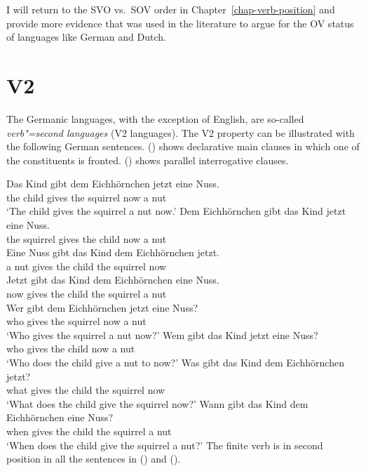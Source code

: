 I will return to the SVO vs.\ SOV order in Chapter~\ref{chap-verb-position} and provide more
evidence that was used in the literature to argue for the OV status of languages like German and Dutch.

\section{V2}
\label{sec-phenomenon-v2}

The Germanic languages, with the exception of English, are so-called \emph{verb"=second languages} (V2
languages). The V2
property can be illustrated with the following German sentences. () shows declarative main
clauses in which one of the constituents is fronted. () shows parallel interrogative clauses.

\eal
\ex 
\gll Das Kind  gibt dem Eichhörnchen jetzt eine Nuss.\\
     the child gives the squirrel now a nut\\
\glt `The child gives the squirrel a nut now.'
\ex 
\gll Dem Eichhörnchen gibt das Kind jetzt eine Nuss.\\
     the squirrel gives the child now a nut\\
\ex 
\gll Eine Nuss gibt das Kind dem Eichhörnchen jetzt.\\
     a nut gives the child the squirrel now\\
\ex 
\gll Jetzt gibt das Kind dem Eichhörnchen eine Nuss.\\
     now gives the child the squirrel a nut\\
\zl
\eal
\ex 
\gll Wer gibt dem Eichhörnchen jetzt eine Nuss?\\  
     who gives the squirrel now a nut\\
\glt `Who gives the squirrel a nut now?'
\ex 
\gll Wem gibt das Kind jetzt eine Nuss?\\
     who gives the child now a nut\\
\glt `Who does the child give a nut to now?'
\ex 
\gll Was gibt das Kind dem Eichhörnchen jetzt?\\
     what gives the child the squirrel now\\
\glt `What does the child give the squirrel now?'
\ex 
\gll Wann gibt das Kind dem Eichhörnchen eine Nuss?\\
     when gives the child the squirrel a nut\\
\glt `When does the child give the squirrel a nut?'
\zl
The finite verb is in second position in all the sentences in () and ().


